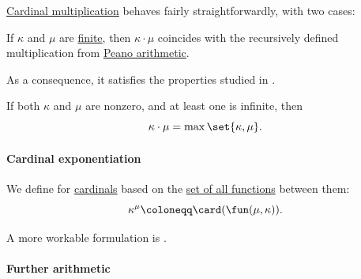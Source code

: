 \begin{proposition}\label{thm:simplified_cardinal_multiplication}
  \hyperref[def:cardinal_multiplication]{Cardinal multiplication} behaves fairly straightforwardly, with two cases:
  \begin{thmenum}
     If \( \kappa \) and \( \mu \) are \hyperref[def:aleph_zero_related_cardinalities]{finite}, then \( \kappa \cdot \mu \) coincides with the recursively defined multiplication from \hyperref[def:peano_arithmetic]{Peano arithmetic}.

    As a consequence, it satisfies the properties studied in .

     If both \( \kappa \) and \( \mu \) are nonzero, and at least one is infinite, then
    \begin{equation*}
      \kappa \cdot \mu = \max\set{ \kappa, \mu }.
    \end{equation*}
  \end{thmenum}
\end{proposition}

\paragraph{Cardinal exponentiation}

\begin{definition}\label{def:cardinal_exponentiation}
  We define  for \hyperref[def:cardinal]{cardinals} based on the \hyperref[def:set_of_all_functions]{set of all functions} between them:
  \begin{equation*}
    \kappa^\mu \coloneqq \card(\fun(\mu, \kappa)).
  \end{equation*}
\end{definition}
\begin{comments}
  \item A more workable formulation is .
\end{comments}

\paragraph{Further arithmetic}

